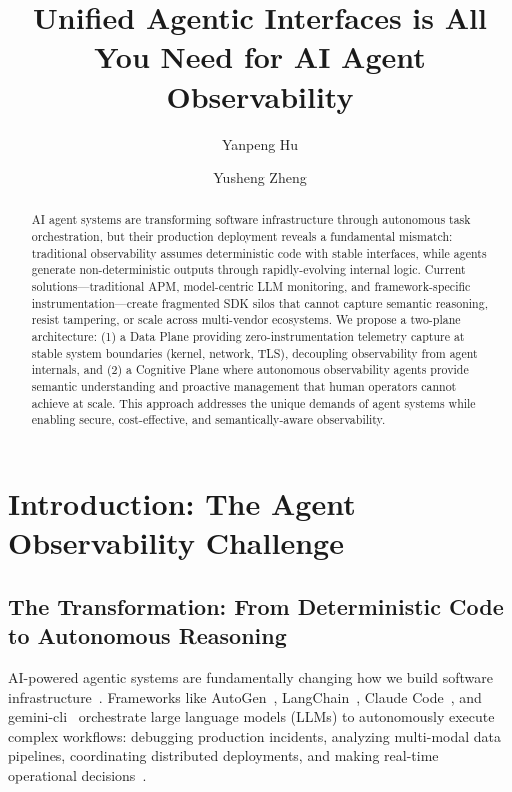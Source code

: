 \documentclass[sigplan,screen,9pt]{acmart}
\begin{document}
\title{Unified Agentic Interfaces is All You Need for AI Agent Observability}

\author{Yanpeng Hu}

\author{Yusheng Zheng}


\sloppy
\begin{abstract}
AI agent systems are transforming software infrastructure through autonomous task orchestration, but their production deployment reveals a fundamental mismatch: traditional observability assumes deterministic code with stable interfaces, while agents generate non-deterministic outputs through rapidly-evolving internal logic. Current solutions—traditional APM, model-centric LLM monitoring, and framework-specific instrumentation—create fragmented SDK silos that cannot capture semantic reasoning, resist tampering, or scale across multi-vendor ecosystems. We propose a two-plane architecture: (1) a Data Plane providing zero-instrumentation telemetry capture at stable system boundaries (kernel, network, TLS), decoupling observability from agent internals, and (2) a Cognitive Plane where autonomous observability agents provide semantic understanding and proactive management that human operators cannot achieve at scale. This approach addresses the unique demands of agent systems while enabling secure, cost-effective, and semantically-aware observability.
\end{abstract}


\maketitle



\section{Introduction: The Agent Observability Challenge}

\subsection{The Transformation: From Deterministic Code to Autonomous Reasoning}

AI-powered agentic systems are fundamentally changing how we build software infrastructure~\cite{wang2024survey,guo2024survey}. Frameworks like AutoGen~\cite{autogen}, LangChain~\cite{langchain}, Claude Code~\cite{claudecode}, and gemini-cli~\cite{geminicli} orchestrate large language models (LLMs) to autonomously execute complex workflows: debugging production incidents, analyzing multi-modal data pipelines, coordinating distributed deployments, and making real-time operational decisions~\cite{tran2025survey}.
\end{document}
